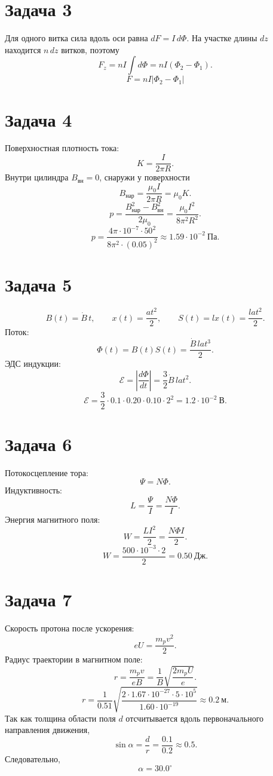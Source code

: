 \documentclass[a4paper,12pt]{article}
\begin{document}
\section*{Задача 3}

Для одного витка сила вдоль оси равна \(dF=I\,d\Phi\). На участке длины
\(dz\) находится \(n\,dz\) витков, поэтому
\[
    F_z=nI\int d\Phi=nI(\Phi_2-\Phi_1).
\]
\[
    F=nI|\Phi_2-\Phi_1|
\]

\section*{Задача 4}

Поверхностная плотность тока:
\[
    K=\frac{I}{2\pi R}.
\]
Внутри цилиндра \(B_{\text{вн}}=0\), снаружи у поверхности
\[
    B_{\text{нар}}=\frac{\mu_0 I}{2\pi R}=\mu_0 K.
\]
\[
    p=\frac{B_{\text{нар}}^2-B_{\text{вн}}^2}{2\mu_0}
    =\frac{\mu_0 I^2}{8\pi^2R^2}.
\]
\[
    p=\frac{4\pi\cdot10^{-7}\cdot 50^2}
    {8\pi^2\cdot(0.05)^2}
    \approx 1.59\cdot10^{-2}\ \text{Па}.
\]


\section*{Задача 5}

\[
    B(t)=\dot B\,t,\qquad
    x(t)=\frac{at^2}{2},\qquad
    S(t)=lx(t)=\frac{lat^2}{2}.
\]
Поток:
\[
    \Phi(t)=B(t)S(t)=\frac{\dot B\,l a t^3}{2}.
\]
ЭДС индукции:
\[
    \mathcal{E}=\left|\frac{d\Phi}{dt}\right|
    =\frac{3}{2}\dot B\,l a t^2.
\]
\[
    \mathcal{E}=
    \frac{3}{2}\cdot0.1\cdot0.20\cdot0.10\cdot2^2
    =1.2\cdot10^{-2}\ \text{В}.
\]

\section*{Задача 6}

Потокосцепление тора:
\[
    \Psi=N\Phi.
\]
Индуктивность:
\[
    L=\frac{\Psi}{I}=\frac{N\Phi}{I}.
\]
Энергия магнитного поля:
\[
    W=\frac{LI^2}{2}=\frac{N\Phi I}{2}.
\]
\[
    W=\frac{500\cdot10^{-3}\cdot2}{2}=0.50\ \text{Дж}.
\]

\section*{Задача 7}

Скорость протона после ускорения:
\[
    eU=\frac{m_pv^2}{2}.
\]
Радиус траектории в магнитном поле:
\[
    r=\frac{m_pv}{eB}
    =\frac{1}{B}\sqrt{\frac{2m_pU}{e}}.
\]
\[
    r=\frac{1}{0.51}\sqrt{\frac{2\cdot1.67\cdot10^{-27}\cdot5\cdot10^5}
    {1.60\cdot10^{-19}}}
    \approx 0.2\ \text{м}.
\]
Так как толщина области поля \(d\) отсчитывается вдоль первоначального
направления движения,
\[
    \sin\alpha=\frac{d}{r}=\frac{0.1}{0.2}\approx 0.5.
\]
Следовательно,
\[
    \alpha= 30.0^\circ
\]
\end{document}
